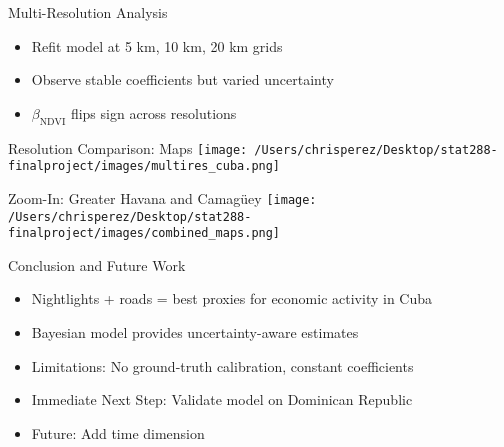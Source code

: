 \documentclass{beamer}
\begin{document}
\begin{frame}{Multi-Resolution Analysis}
\begin{itemize}
  \item Refit model at 5 km, 10 km, 20 km grids
  \item Observe stable coefficients but varied uncertainty
  \item $\beta_{\text{NDVI}}$ flips sign across resolutions
\end{itemize}
\end{frame}

\begin{frame}{Resolution Comparison: Maps}
\texttt{[image: /Users/chrisperez/Desktop/stat288-finalproject/images/multires\_cuba.png]}
\end{frame}

\begin{frame}{Zoom-In: Greater Havana and Camagüey}
\texttt{[image: /Users/chrisperez/Desktop/stat288-finalproject/images/combined\_maps.png]}
\end{frame}


\begin{frame}{Conclusion and Future Work}
\begin{itemize}
  \item Nightlights + roads = best proxies for economic activity in Cuba
  \item Bayesian model provides uncertainty-aware estimates
  \item Limitations: No ground-truth calibration, constant coefficients
  \item Immediate Next Step: Validate model on Dominican Republic
  \item Future: Add time dimension
\end{itemize}
\end{frame}
\end{document}
